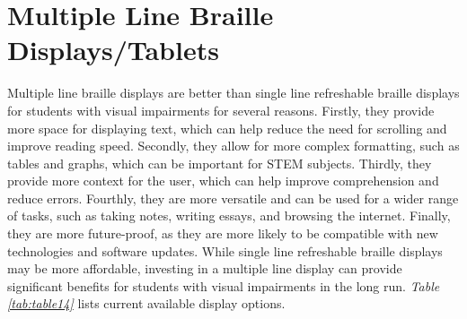 \pagebreak
\hypertarget{multiple-line-refreshable-braille-displaystablets}{}\section{Multiple Line Braille Displays/Tablets}\label{multiple-line-refreshable-braille-displaystablets}
Multiple line braille displays are better than single line refreshable braille displays for students with visual impairments for several reasons. Firstly, they provide more space for displaying text, which can help reduce the need for scrolling and improve reading speed. Secondly, they allow for more complex formatting, such as tables and graphs, which can be important for STEM subjects. Thirdly, they provide more context for the user, which can help improve comprehension and reduce errors. Fourthly, they are more versatile and can be used for a wider range of tasks, such as taking notes, writing essays, and browsing the internet. Finally, they are more future-proof, as they are more likely to be compatible with new technologies and software updates. While single line refreshable braille displays may be more affordable, investing in a multiple line display can provide significant benefits for students with visual impairments in the long run. \textit{Table \ref{tab:table14}} lists current available display options.


\pagebreak 
 
